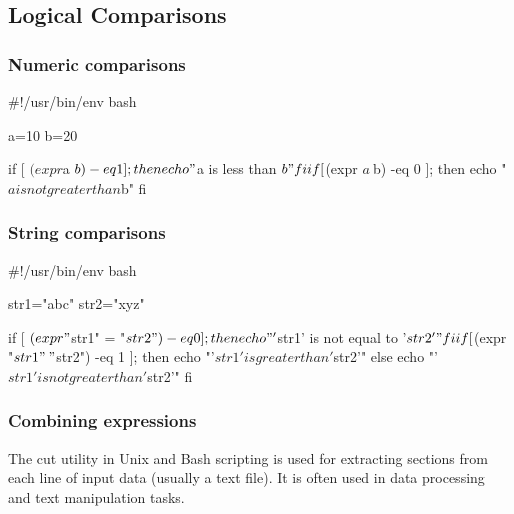 \documentclass{report}
\begin{document}
    \bigbreak \noindent 
    \subsection{Logical Comparisons}
    \bigbreak \noindent 
    \subsubsection{Numeric comparisons}
    \bigbreak \noindent 
    \begin{bashcode}
    #!/usr/bin/env bash

    a=10
    b=20

    if [ $(expr $a \< $b) -eq 1 ]; then
      echo "$a is less than $b"
    fi

    if [ $(expr $a \> $b) -eq 0 ]; then
      echo "$a is not greater than $b"
    fi
    \end{bashcode}

    \pagebreak 
    \subsubsection{String comparisons}
    \bigbreak \noindent 
    \begin{bashcode}
#!/usr/bin/env bash

str1="abc"
str2="xyz"

if [ $(expr "$str1" = "$str2") -eq 0 ]; then
  echo "'$str1' is not equal to '$str2'"
fi

if [ $(expr "$str1" \> "$str2") -eq 1 ]; then
  echo "'$str1' is greater than '$str2'"
else
  echo "'$str1' is not greater than '$str2'"
fi
    \end{bashcode}

    \bigbreak \noindent 
    \subsubsection{Combining expressions}
    \bigbreak \noindent 

    \pagebreak 
    \bigbreak \noindent 
    The cut utility in Unix and Bash scripting is used for extracting sections from each line of input data (usually a text file). It is often used in data processing and text manipulation tasks. 
    \bigbreak \noindent 
\end{document}
